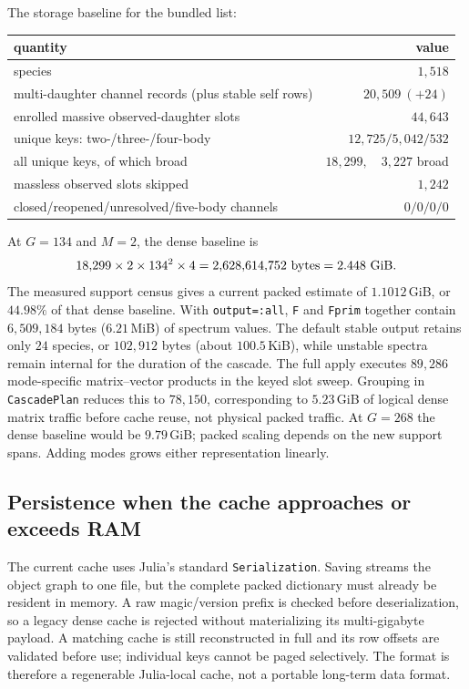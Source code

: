 \documentclass[11pt]{article}
\begin{document}
The storage baseline for the bundled list:
\begin{center}
\begin{tabular}{lr}
\hline
quantity & value\\
\hline
species & $1{,}518$\\
multi-daughter channel records (plus stable self rows) & $20{,}509\ (+24)$\\
enrolled massive observed-daughter slots & $44{,}643$\\
unique keys: two-/three-/four-body & $12{,}725/5{,}042/532$\\
all unique keys, of which broad & $18{,}299,\quad 3{,}227$ broad\\
massless observed slots skipped & $1{,}242$\\
closed/reopened/unresolved/five-body channels & $0/0/0/0$\\
\hline
\end{tabular}
\end{center}
At $G=134$ and $M=2$, the dense baseline is
\begin{equation}
18{,}299\times2\times134^2\times4
=2{,}628{,}614{,}752\ {\rm bytes}
=2.448\ {\rm GiB}.
\end{equation}
The measured support census gives a current packed estimate of
$1.1012$\,GiB, or $44.98\%$ of that dense baseline.
With \texttt{output=:all}, \texttt{F} and \texttt{Fprim} together contain
$6{,}509{,}184$ bytes ($6.21$\,MiB) of spectrum values.  The default stable
output retains only $24$ species, or $102{,}912$ bytes (about
$100.5$\,KiB), while unstable spectra remain internal for the duration of the
cascade.  The full apply executes $89{,}286$ mode-specific matrix--vector
products in the keyed slot sweep.  Grouping in \texttt{CascadePlan} reduces
this to $78{,}150$,
corresponding to $5.23$\,GiB of logical dense matrix traffic before cache
reuse, not physical packed traffic.  At $G=268$ the dense baseline would be
$9.79$\,GiB; packed scaling depends on the new support spans.  Adding modes
grows either representation linearly.

\subsection{Persistence when the cache approaches or exceeds RAM}

The current cache uses Julia's standard \texttt{Serialization}.  Saving
streams the object graph to one file, but the complete packed dictionary must
already be resident in memory.  A raw magic/version prefix is checked before
deserialization, so a legacy dense cache is rejected without materializing
its multi-gigabyte payload.  A matching cache is still reconstructed in full
and its row offsets are validated before use; individual keys cannot be
paged selectively.  The format is therefore a regenerable Julia-local cache,
not a portable long-term data format.
\end{document}
